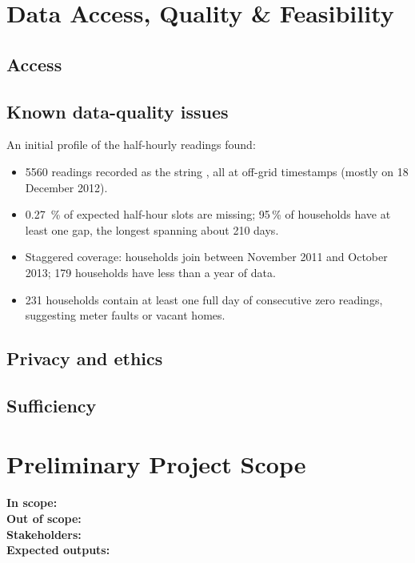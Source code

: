 \documentclass{smartmeter-report}   %
\begin{document}
\section{Data Access, Quality \& Feasibility}
\subsection{Access}

\subsection{Known data-quality issues}
An initial profile of the half-hourly readings found:
\begin{itemize}
  \item \num{5560} readings recorded as the string , all at off-grid timestamps
        (mostly on 18 December 2012).
  \item \SI{0.27}{\percent} of expected half-hour slots are missing; 95\,\% of households
        have at least one gap, the longest spanning about 210 days.
  \item Staggered coverage: households join between November 2011 and October 2013;
        179 households have less than a year of data.
  \item 231 households contain at least one full day of consecutive zero readings,
        suggesting meter faults or vacant homes.
\end{itemize}

\subsection{Privacy and ethics}

\subsection{Sufficiency}

\section{Preliminary Project Scope}
\textbf{In scope:} \placeholder{\ldots}\\
\textbf{Out of scope:} \placeholder{\ldots}\\
\textbf{Stakeholders:} \placeholder{\ldots}\\
\textbf{Expected outputs:} 

\printbibliography[heading=bibintoc]
\end{document}
